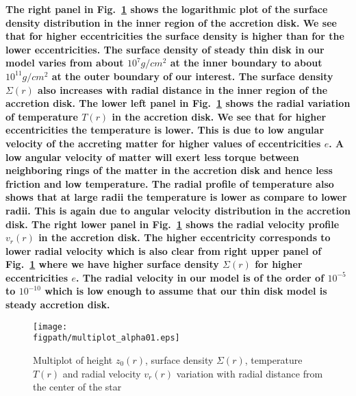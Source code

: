 \documentclass[useAMS,usenatbib]{mn2e}
\newcommand{\figpath}{./Figs/}
\begin{document}
\textbf{The right panel in Fig.~\ref{steadyplt1} shows the logarithmic plot of the surface density distribution in the inner region of the accretion disk. We see that for higher eccentricities the surface density is higher than for the lower eccentricities. The surface density of steady thin disk in our model varies from about $10^7g/cm^2$ at the inner boundary to about $10^11 g/cm^2$ at the outer boundary of our interest. The surface density $\Sigma (r)$ also increases with radial distance in the inner region of the accretion disk. The lower left panel in Fig.~\ref{steadyplt1} shows the radial variation of temperature $T(r)$ in the accretion disk. We see that for higher eccentricities the temperature is lower. This is due to low angular velocity of the accreting matter for higher values of eccentricities $e$. A low angular velocity of matter will exert less torque between neighboring rings of the matter in the accretion disk and hence less friction and low temperature. The radial profile of temperature also shows that at large radii the temperature is lower as compare to lower radii. This is again due to angular velocity distribution in the accretion disk. The right lower panel in Fig.~\ref{steadyplt1} shows the radial velocity profile $v_r(r)$ in the accretion disk. The higher eccentricity corresponds to lower radial velocity which is also clear from right upper panel of Fig.~\ref{steadyplt1} where we have higher surface density $\Sigma(r)$ for higher eccentricities $e$. The radial velocity in our model is of the order of $10^{-5}$ to $10^{-10}$ which is low enough to assume that our thin disk model is steady accretion disk.}

\begin{figure}
\centering
\texttt{[image: \\figpath/multiplot\_alpha01.eps]}
\caption{Multiplot of height $z_0(r)$, surface density $\Sigma(r)$, temperature $T(r)$ and radial velocity $v_r(r)$ variation with radial distance from the center of the star}
\label{steadyplt1}
\end{figure}
\end{document}
